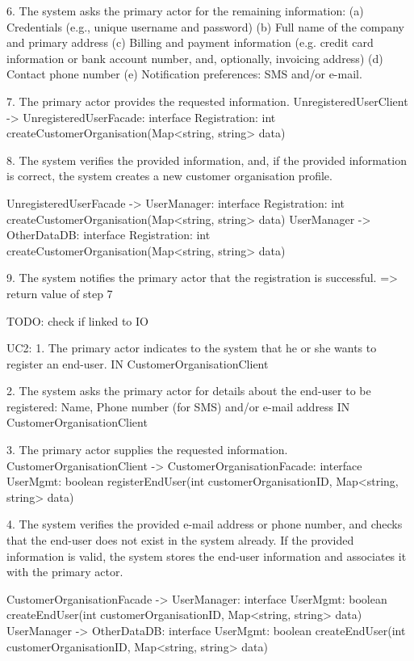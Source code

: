         6. The system asks the primary actor for the remaining information:
           (a) Credentials (e.g., unique username and password)
           (b) Full name of the company and primary address
           (c) Billing and payment information (e.g. credit card information or bank account number,
               and, optionally, invoicing address)
           (d) Contact phone number
           (e) Notification preferences: SMS and/or e-mail.

        7. The primary actor provides the requested information.
            UnregisteredUserClient -> UnregisteredUserFacade: interface Registration: int createCustomerOrganisation(Map<string, string> data)

        8. The system verifies the provided information, and, if the provided information is correct, the
           system creates a new customer organisation profile.

            UnregisteredUserFacade -> UserManager: interface Registration: int createCustomerOrganisation(Map<string, string> data)
            UserManager -> OtherDataDB: interface Registration: int createCustomerOrganisation(Map<string, string> data)

        9. The system notifies the primary actor that the registration is successful.
            => return value of step 7

        TODO: check if linked to IO


    UC2:
        1. The primary actor indicates to the system that he or she wants to register an end-user.
            IN CustomerOrganisationClient

        2. The system asks the primary actor for details about the end-user to be registered:
           Name, Phone number (for SMS) and/or e-mail address
           IN CustomerOrganisationClient

        3. The primary actor supplies the requested information.
            CustomerOrganisationClient -> CustomerOrganisationFacade: interface UserMgmt: boolean registerEndUser(int customerOrganisationID, Map<string, string> data)

        4. The system verifies the provided e-mail address or phone number, and checks that the end-user
            does not exist in the system already. If the provided information is valid, the system stores
            the end-user information and associates it with the primary actor.

            CustomerOrganisationFacade -> UserManager: interface UserMgmt: boolean createEndUser(int customerOrganisationID, Map<string, string> data)
            UserManager -> OtherDataDB: interface UserMgmt: boolean createEndUser(int customerOrganisationID, Map<string, string> data)

